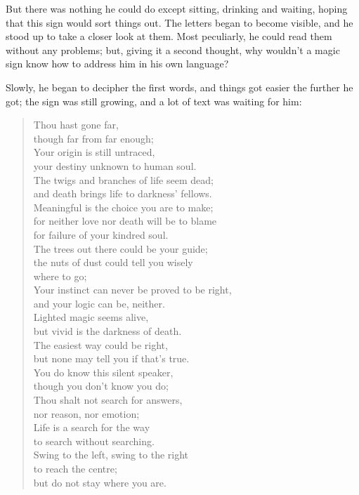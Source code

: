 But there was nothing he could do except sitting, drinking and waiting, hoping that this sign would sort things out. 
The letters began to become visible, and he stood up to take a closer look at them. Most peculiarly, he could read them without any problems; but, giving it a second thought, why wouldn't a magic sign know how to address him in his own language?

Slowly, he began to decipher the first words, and things got easier the further he got; the sign was still growing, and a lot of text was waiting for him:
\begin{quote}
Thou hast gone far,\\
though far from far enough;\\
Your origin is still untraced,\\
your destiny unknown to human soul.\\
The twigs and branches of life seem dead;\\
and death brings life to darkness' fellows.\\
Meaningful is the choice you are to make;\\
for neither love nor death will be to blame\\
for failure of your kindred soul.\\
The trees out there could be your guide;\\
the nuts of dust could tell you wisely\\
where to go;\\
Your instinct can never be proved to be right,\\
and your logic can be, neither.\\
Lighted magic seems alive,\\
but vivid is the darkness of death.\\
The easiest way could be right,\\
but none may tell you if that's true.\\
You do know this silent speaker,\\
though you don't know you do;\\
Thou shalt not search for answers,\\
nor reason, nor emotion;\\
Life is a search for the way\\
to search without searching.\\
Swing to the left, swing to the right\\
to reach the centre;\\
but do not stay where you are.\\

\end{quote}
